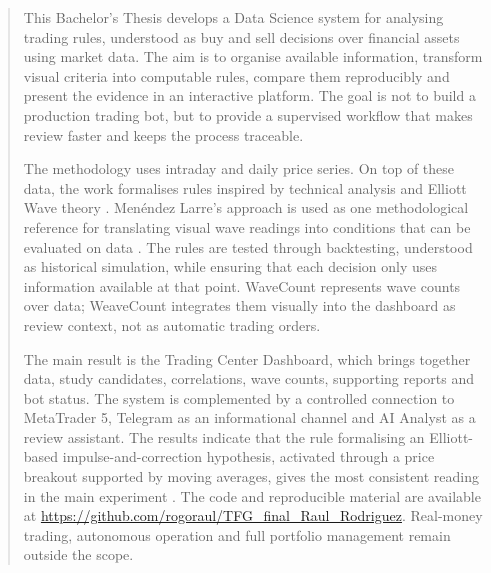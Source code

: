 \documentclass[twoside,spanish,a4paper,12pt]{tfg}
\makeatletter
\renewcommand{\cleardoublepage}{%
  \clearpage
  \if@twoside
    \ifodd\c@page
    \else
      \thispagestyle{empty}%
      \hbox{}%
      \newpage
      \if@twocolumn\hbox{}\newpage\fi
    \fi
  \fi
}
\makeatother
\begin{document}
{}
\begin{abstract}
This Bachelor's Thesis develops a Data Science system for analysing trading
rules, understood as buy and sell decisions over financial assets using market
data. The aim is to organise available information, transform visual criteria
into computable rules, compare them reproducibly and present the evidence in an
interactive platform. The goal is not to build a production trading bot, but to
provide a supervised workflow that makes review faster and keeps the process
traceable.

The methodology uses intraday and daily price series. On top of these data, the
work formalises rules inspired by technical analysis and Elliott Wave theory
\cite{frost_prechter_1985_elliott}. Men\'endez Larre's approach is used as one
methodological reference for translating visual wave readings into conditions
that can be evaluated on data \cite{menendez_larre_2016_ondas}. The rules are
tested through backtesting, understood as historical simulation, while ensuring
that each decision only uses information available at that point. WaveCount
represents wave counts over data; WeaveCount integrates them visually into the
dashboard as review context, not as automatic trading orders.

The main result is the Trading Center Dashboard, which brings together data,
study candidates, correlations, wave counts, supporting reports and bot status.
The system is complemented by a controlled connection to MetaTrader 5, Telegram
as an informational channel and AI Analyst as a review assistant. The results
indicate that the rule formalising an Elliott-based impulse-and-correction
hypothesis, activated through a price breakout supported by moving averages,
gives the most consistent reading in the main experiment
\cite{pardo_2008_trading_strategies,bailey_etal_2017_backtest_overfitting}. The
code and reproducible material are available at
\url{https://github.com/rogoraul/TFG_final_Raul_Rodriguez}. Real-money trading,
autonomous operation and full portfolio management remain outside the scope.
\end{abstract}
\cleardoublepage
\end{document}
